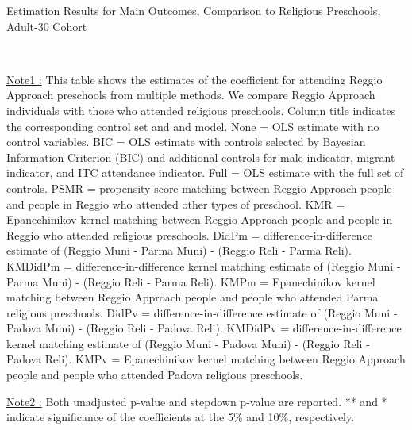 \begin{table}[H] \caption{Estimation Results for Main Outcomes, Comparison to Religious Preschools, Adult-30 Cohort} \label{ols-M-adult30-reg-reli}
\scalebox{0.59}{}
\vspace{1ex} \\
\footnotesize\raggedright{\underline{Note1 :} This table shows the estimates of the coefficient for attending Reggio Approach preschools from multiple methods. We compare Reggio Approach individuals with those who attended religious preschools. Column title indicates the corresponding control set and and model. None = OLS estimate with no control variables. BIC = OLS estimate with controls selected by Bayesian Information Criterion (BIC) and additional controls for male indicator, migrant indicator, and ITC attendance indicator. Full = OLS estimate with the full set of controls. PSMR =  propensity score matching between Reggio Approach people and people in Reggio who attended other types of preschool. KMR = Epanechinikov kernel matching between Reggio Approach people and people in Reggio who attended religious preschools. DidPm = difference-in-difference estimate of (Reggio Muni - Parma Muni) - (Reggio Reli - Parma Reli). KMDidPm = difference-in-difference kernel matching estimate of (Reggio Muni - Parma Muni) - (Reggio Reli - Parma Reli). KMPm = Epanechinikov kernel matching between Reggio Approach people and people who attended Parma religious preschools. DidPv = difference-in-difference estimate of (Reggio Muni - Padova Muni) - (Reggio Reli - Padova Reli). KMDidPv = difference-in-difference kernel matching estimate of (Reggio Muni - Padova Muni) - (Reggio Reli - Padova Reli).  KMPv = Epanechinikov kernel matching between Reggio Approach people and people who attended Padova religious preschools.}

\footnotesize\raggedright{\underline{Note2 :} Both unadjusted p-value and stepdown p-value are reported. ** and * indicate significance of the coefficients at the 5\% and 10\%, respectively.}

\end{table}

